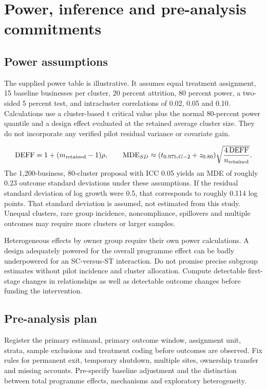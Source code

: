 \documentclass[11pt,a4paper]{report}
\begin{document}
\chapter{Power, inference and pre-analysis commitments}
\section{Power assumptions}
The supplied power table is illustrative. It assumes equal treatment assignment, 15 baseline businesses per cluster, 20 percent attrition, 80 percent power, a two-sided 5 percent test, and intracluster correlations of 0.02, 0.05 and 0.10. Calculations use a cluster-based t critical value plus the normal 80-percent power quantile and a design effect evaluated at the retained average cluster size. They do not incorporate any verified pilot residual variance or covariate gain.

\[
\operatorname{DEFF}=1+(m_{\rm retained}-1)\rho,\qquad
\operatorname{MDE}_{SD}\approx
(t_{0.975,G-2}+z_{0.80})\sqrt{\frac{4\operatorname{DEFF}}{n_{\rm retained}}}.
\]
The 1,200-business, 80-cluster proposal with ICC 0.05 yields an MDE of roughly 0.23 outcome standard deviations under these assumptions. If the residual standard deviation of log growth were 0.5, that corresponds to roughly 0.114 log points. That standard deviation is assumed, not estimated from this study. Unequal clusters, rare group incidence, noncompliance, spillovers and multiple outcomes may require more clusters or larger samples.

Heterogeneous effects by owner group require their own power calculations. A design adequately powered for the overall programme effect can be badly underpowered for an SC-versus-ST interaction. Do not promise precise subgroup estimates without pilot incidence and cluster allocation. Compute detectable first-stage changes in relationships as well as detectable outcome changes before funding the intervention.

\section{Pre-analysis plan}
Register the primary estimand, primary outcome window, assignment unit, strata, sample exclusions and treatment coding before outcomes are observed. Fix rules for permanent exit, temporary shutdown, multiple sites, ownership transfer and missing accounts. Pre-specify baseline adjustment and the distinction between total programme effects, mechanisms and exploratory heterogeneity.
\end{document}
